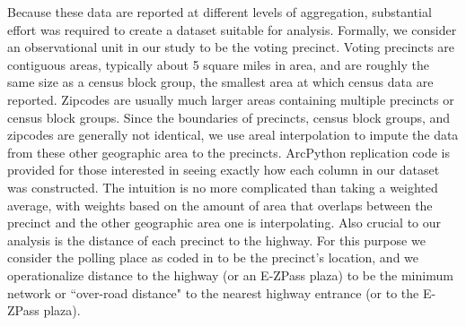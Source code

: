 Because these data are reported at different levels of aggregation, substantial effort was required to create a dataset suitable for analysis. Formally, we consider an observational unit in our study to be the voting precinct. Voting precincts are contiguous areas, typically about 5 square miles in area, and are roughly the same size as a census block group, the smallest area at which census data are reported. Zipcodes are usually much larger areas containing multiple precincts or census block groups. Since the boundaries of precincts, census block groups, and zipcodes are generally not identical, we use areal interpolation to impute the data from these other geographic area to the precincts. ArcPython replication code is provided for those interested in seeing exactly how each column in our dataset was constructed. The intuition is no more complicated than taking a weighted average, with weights based on the amount of area that overlaps between the precinct and the other geographic area one is interpolating. Also crucial to our analysis is the distance of each precinct to the highway. For this purpose we consider the polling place as coded in \textcite{Ansolabehere2014} to be the precinct's location, and we operationalize distance to the highway (or an E-ZPass plaza) to be the minimum network or ``over-road distance" to the nearest highway entrance (or to the E-ZPass plaza).  